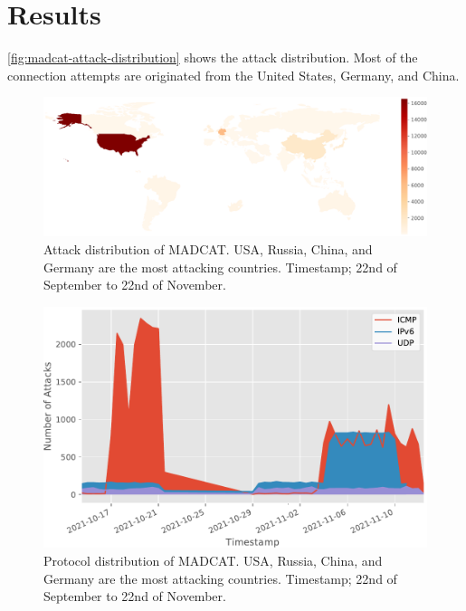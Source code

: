 \section{Results}




\autoref{fig:madcat-attack-distribution} shows the attack distribution.
Most of the connection attempts are originated from the United States, Germany, and China.

\begin{figure}[ht]
    \centering
    \includegraphics[width=\textwidth]{figures/madcat-overview-map.pdf}
    \caption[Attack distribution of MADCAT]{Attack distribution of MADCAT. USA, Russia, China, and Germany are the most attacking countries. Timestamp; 22nd of September to 22nd of November.}
    \label{fig:madcat-attack-distribution}
\end{figure}

\begin{figure}[ht]
    \centering
    \includegraphics[width=\textwidth]{figures/madcat-protocol-usage.pdf}
    \caption[Protocol distribution of MADCAT]{Protocol distribution of MADCAT. USA, Russia, China, and Germany are the most attacking countries. Timestamp; 22nd of September to 22nd of November.}
    \label{fig:madcat-protocols}
\end{figure}
